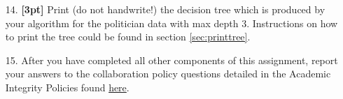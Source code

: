 \documentclass[11pt]{article}
\numberwithin{equation}{section} %
\numberwithin{figure}{section} %
\numberwithin{table}{section} %
\begin{document}
\begin{enumerate}
    
\clearpage
    \item[14.] \textbf{[3pt]} Print (do not handwrite!) the decision tree which is produced by your algorithm for the politician data with max depth 3. Instructions on how to print the tree could be found in section \ref{sec:printtree}.
    
     \begin{solution}
    \bigskip \bigskip \bigskip \bigskip \bigskip \bigskip \bigskip \bigskip
    \bigskip \bigskip \bigskip \bigskip \bigskip \bigskip \bigskip \bigskip
    \bigskip \bigskip \bigskip \bigskip \bigskip \bigskip \bigskip \bigskip
    \bigskip \bigskip \bigskip \bigskip \bigskip \bigskip \bigskip \bigskip
    \bigskip \bigskip \bigskip \bigskip \bigskip \bigskip \bigskip \bigskip
    \bigskip \bigskip \bigskip \bigskip \bigskip \bigskip \bigskip \bigskip
    \bigskip \bigskip \bigskip \bigskip \bigskip \bigskip \bigskip \bigskip
    \end{solution}



    
    
    \clearpage
    \item[15.] After you have completed all other components of this assignment, report your answers to the collaboration policy questions detailed in the Academic Integrity Policies found \href{http://www.cs.cmu.edu/~mgormley/courses/10601bd-f18/about.html#7-academic-integrity-policies}{here}.
    
    \begin{solution}
    \bigskip \bigskip \bigskip \bigskip \bigskip \bigskip \bigskip \bigskip
    \bigskip \bigskip \bigskip \bigskip \bigskip \bigskip \bigskip \bigskip
    \bigskip \bigskip \bigskip \bigskip \bigskip \bigskip \bigskip \bigskip
    \bigskip \bigskip \bigskip \bigskip \bigskip \bigskip \bigskip \bigskip
    \bigskip \bigskip \bigskip \bigskip \bigskip \bigskip \bigskip \bigskip
    \bigskip \bigskip \bigskip \bigskip \bigskip \bigskip \bigskip \bigskip
    \bigskip \bigskip \bigskip \bigskip \bigskip \bigskip \bigskip \bigskip
    \end{solution}
    
\end{enumerate}
\end{document}
